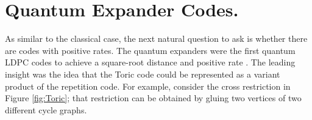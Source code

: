 %
%

%
 
\section{Quantum Expander Codes.}
As similar to the classical case, the next natural question to ask is whether there are codes with positive rates. The quantum expanders were the first quantum LDPC codes to achieve a square-root distance and positive rate \cite{Tillich_2014, Leverrier_2015}. The leading insight was the idea that the Toric code could be represented as a variant product of the repetition code. For example, consider the cross restriction in Figure \cref{fig:Toric}; that restriction can be obtained by gluing two vertices of two different cycle graphs.

